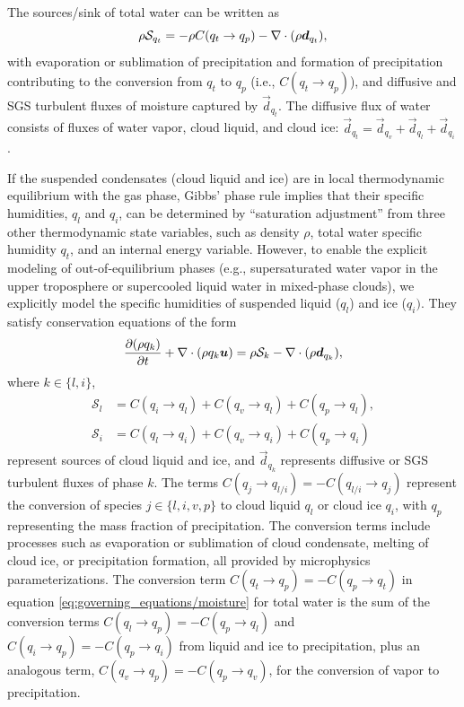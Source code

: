 \documentclass{article}
\begin{document}
The sources/sink of total water can be written as  
\begin{equation}
     \rho \mathcal{S}_{q_t} = - \rho C(q_t \rightarrow q_p) - \nabla \cdot (\rho \boldsymbol{{d}}_{q_t}),
\end{equation}
with evaporation or sublimation of precipitation and formation of precipitation contributing to the conversion from $q_t$ to $q_p$ (i.e., $C(q_t \rightarrow q_p)$), and diffusive and SGS turbulent fluxes of moisture captured by $\vec{d}_{q_t}$. The diffusive flux of water consists of fluxes of water vapor, cloud liquid, and cloud ice: $\vec{d}_{q_t} =\vec{d}_{q_v} + \vec{d}_{q_l} + \vec{d}_{q_i}$ \citep{Romps08a}.

If the suspended condensates (cloud liquid and ice) are in local thermodynamic equilibrium with the gas phase, Gibbs' phase rule implies that their specific humidities, $q_l$ and $q_i$, can be determined by ``saturation adjustment'' from three other thermodynamic state variables, such as density $\rho$, total water specific humidity $q_t$, and an internal energy variable. However, to enable the explicit modeling of out-of-equilibrium phases (e.g., supersaturated water vapor in the upper troposphere or supercooled liquid water in mixed-phase clouds), we explicitly model the specific humidities of suspended liquid ($q_l$) and ice ($q_i)$. They satisfy conservation equations of the form
\begin{equation}
\frac{\partial (\rho q_k)}{\partial t} + \nabla \cdot (\rho q_k \boldsymbol{{u}}) = \rho \mathcal{S}_k  -\nabla \cdot (\rho \boldsymbol{{d}}_{q_k}),   
\label{eq:governing_equations/condensate}
\end{equation}
where $k \in \{l, i\}$, 
\begin{align}
    \mathcal{S}_l & = C(q_i \rightarrow q_l) + C(q_v \rightarrow q_l) + C(q_p \rightarrow q_l), \\
    \mathcal{S}_i & = C(q_l \rightarrow q_i) + C(q_v \rightarrow q_i) + C(q_p \rightarrow q_i)
\end{align}
represent sources of cloud liquid and ice, and $\vec{d}_{q_k}$ represents diffusive or SGS turbulent fluxes of phase $k$. The terms $C(q_j \rightarrow q_{l/i}) = - C(q_{l/i} \rightarrow q_j)$ represent the conversion of species $j \in \{l, i, v, p\}$ to cloud liquid $q_l$ or cloud ice $q_i$, with $q_p$ representing the mass fraction of precipitation. The conversion terms include processes such as evaporation or sublimation of cloud condensate, melting of cloud ice, or precipitation formation, all provided by microphysics parameterizations. The conversion term $C(q_t \rightarrow q_p) = -C(q_p \rightarrow q_t)$ in equation \eqref{eq:governing_equations/moisture} for total water is the sum of the conversion terms $C(q_l \rightarrow q_p)=-C(q_p \rightarrow q_l)$ and $C(q_i \rightarrow q_p)=-C(q_p \rightarrow q_i)$ from liquid and ice to precipitation, plus an analogous term, $C(q_v \rightarrow q_p)=-C(q_p \rightarrow q_v)$, for the conversion of vapor to precipitation. 
\end{document}
